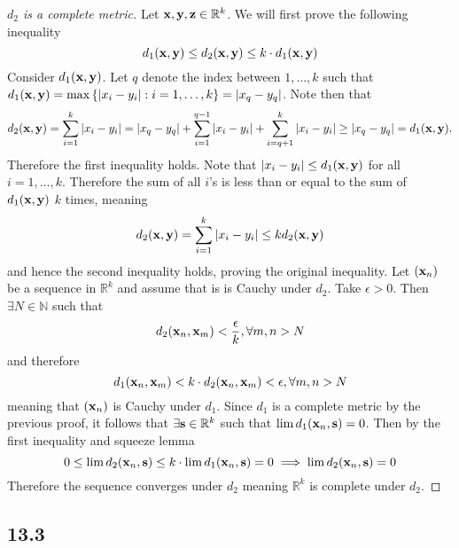\documentclass[12pt,titlepage]{extarticle}
\begin{document}
\begin{proof}[$d_2$ is a complete metric]
    Let $\vb{x},\vb{y},\vb{z} \in \mathbb{R}^k$. We will first prove the following inequality
    \[
        d_1(\vb{x},\vb{y}) \leq d_2(\vb{x},\vb{y}) \leq k \cdot d_1(\vb{x},\vb{y})
    \]
    Consider $d_1(\vb{x}, \vb{y})$. Let $q$ denote the index between $1,\ldots,k$ such that $d_1(\vb{x}, \vb{y}) = \max\qty{|x_i - y_i| : i = 1,\ldots,k} = |x_q - y_q|$. Note then that
    \[
        d_2(\vb{x}, \vb{y}) = \sum_{i=1}^k |x_i - y_i| = |x_q - y_q| + \sum_{i = 1}^{q-1} |x_i - y_i| + \sum_{i=q+1}^{k} |x_i - y_i| \geq |x_q - y_q| = d_1(\vb{x}, \vb{y})
    .\]
    Therefore the first inequality holds. Note that $|x_i - y_i| \leq d_1(\vb{x}, \vb{y})$ for all $i = 1, \ldots,k$. Therefore the sum of all $i$'s is less than or equal to the sum of $d_1(\vb{x}, \vb{y})$ $k$ times, meaning
    \[
        d_2(\vb{x}, \vb{y}) = \sum_{i = 1}^k |x_i - y_i| \leq k d_2(\vb{x}, \vb{y})
    \]
    and hence the second inequality holds, proving the original inequality. Let $(\vb{x}_n)$ be a sequence in $\mathbb{R}^k$ and assume that is is Cauchy under $d_2$. Take $\epsilon > 0$. Then $\exists N \in \mathbb{N}$ such that
    \[
        d_2(\vb{x}_n, \vb{x}_m) < \frac{\epsilon}{k}, \forall m,n > N
    \]
    and therefore
    \[
        d_1(\vb{x}_n, \vb{x}_m) < k \cdot d_2(\vb{x}_n, \vb{x}_m) < \epsilon, \forall m,n > N
    \]
    meaning that $(\vb{x}_n)$ is Cauchy under $d_1$. Since $d_1$ is a complete metric by the previous proof, it follows that $\exists \vb{s} \in \mathbb{R}^k$ such that $\lim d_1(\vb{x}_n, \vb{s}) = 0$. Then by the first inequality and squeeze lemma
    \[
        0 \leq \lim d_2(\vb{x}_n, \vb{s}) \leq k \cdot \lim d_1(\vb{x}_n, \vb{s}) = 0 \implies \lim d_2(\vb{x}_n, \vb{s}) = 0
    \]
    Therefore the sequence converges under $d_2$ meaning $\mathbb{R}^k$ is complete under $d_2$.
\end{proof}

\subsection*{13.3}
\end{document}
